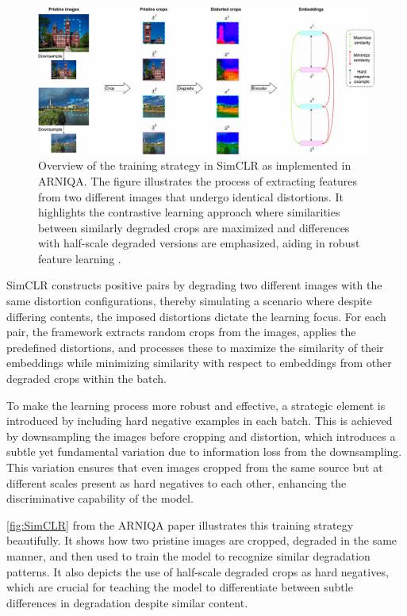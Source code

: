 \begin{figure}[ht]
    \centering
    \includegraphics[keepaspectratio,width=15cm]{img/method_SimCLR.jpg}
    \caption{Overview of the training strategy in SimCLR as implemented in ARNIQA. The figure illustrates the process of extracting features from two different images that undergo identical distortions. It highlights the contrastive learning approach where similarities between similarly degraded crops are maximized and differences with half-scale degraded versions are emphasized, aiding in robust feature learning \autocite{ARNIQA}.}
    \label{fig:SimCLR}
\end{figure}
\vspace{\baselineskip}
\noindent
SimCLR constructs positive pairs by degrading two different images with the same distortion configurations, thereby simulating a scenario where despite differing contents, the imposed distortions dictate the learning focus. For each pair, the framework extracts random crops from the images, applies the predefined distortions, and processes these to maximize the similarity of their embeddings while minimizing similarity with respect to embeddings from other degraded crops within the batch. \par
\vspace{\baselineskip}
\noindent
To make the learning process more robust and effective, a strategic element is introduced by including hard negative examples in each batch. This is achieved by downsampling the images before cropping and distortion, which introduces a subtle yet fundamental variation due to information loss from the downsampling. This variation ensures that even images cropped from the same source but at different scales present as hard negatives to each other, enhancing the discriminative capability of the model. \par
\vspace{\baselineskip}
\noindent
\autoref{fig:SimCLR} from the ARNIQA paper illustrates this training strategy beautifully. It shows how two pristine images are cropped, degraded in the same manner, and then used to train the model to recognize similar degradation patterns. It also depicts the use of half-scale degraded crops as hard negatives, which are crucial for teaching the model to differentiate between subtle differences in degradation despite similar content. \par
\vspace{\baselineskip}
\noindent


